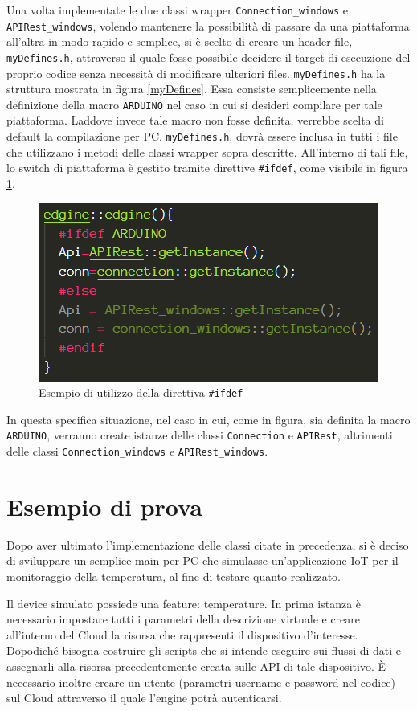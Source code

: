 Una volta implementate le due classi wrapper \texttt{Connection\_windows} e \\\texttt{APIRest\_windows}, volendo mantenere la possibilità di passare da una piattaforma all'altra in modo rapido e semplice, si è scelto di creare un header file, \texttt{myDefines.h}, attraverso il quale fosse possibile decidere il target di esecuzione del proprio codice senza necessità di modificare ulteriori files. \texttt{myDefines.h} ha la struttura mostrata in figura \ref{myDefines}. Essa consiste semplicemente nella definizione della macro \texttt{ARDUINO} nel caso in cui si desideri compilare per tale piattaforma. Laddove invece tale macro non fosse definita, verrebbe scelta di default la compilazione per PC. \texttt{myDefines.h}, dovrà essere inclusa in tutti i file che utilizzano i metodi delle classi wrapper sopra descritte. All'interno di tali file, lo switch di piattaforma è gestito tramite direttive \texttt{\#ifdef}, come visibile in figura \ref{ifdef}.

\begin{figure}[H]
	\centering
	\includegraphics[width=0.66\linewidth]{pics/ifdef}
	\caption{Esempio di utilizzo della direttiva \texttt{\#ifdef}}
	\label{ifdef}
\end{figure}

In questa specifica situazione, nel caso in cui, come in figura, sia definita la macro \texttt{ARDUINO}, verranno create istanze delle classi \texttt{Connection} e \texttt{APIRest}, altrimenti delle classi \texttt{Connection\_windows} e \texttt{APIRest\_windows}.
\section{Esempio di prova}\label{prova}
Dopo aver ultimato l’implementazione delle classi citate in precedenza, si è deciso di sviluppare un semplice main per PC che simulasse un’applicazione IoT per il monitoraggio della temperatura, al fine di testare quanto realizzato.

Il device simulato possiede una feature: temperature. In prima istanza è necessario impostare tutti i parametri della descrizione virtuale e creare all'interno del Cloud la risorsa che rappresenti il dispositivo d’interesse. Dopodiché bisogna costruire gli scripts che si intende eseguire sui flussi di dati e assegnarli alla risorsa precedentemente creata sulle API di tale dispositivo. È necessario inoltre creare un utente (parametri username e password nel codice) sul Cloud attraverso il quale l'engine potrà autenticarsi.

